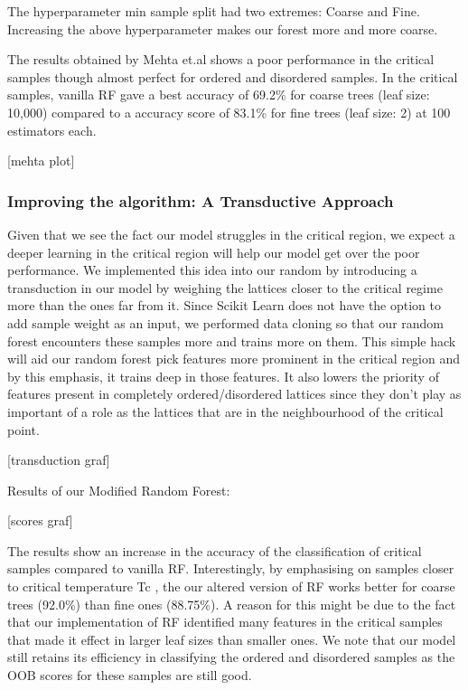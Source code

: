 The hyperparameter min sample split had two extremes: Coarse and Fine. Increasing the above hyperparameter makes our forest more and more coarse.

The results obtained by Mehta et.al\cite{mehta} shows a poor performance in the critical samples though almost perfect for ordered and disordered samples. In the critical samples, vanilla RF gave a best accuracy of 69.2\% for coarse trees (leaf size: 10,000) compared to a accuracy score of 83.1\% for fine trees (leaf size: 2) at 100 estimators each.

[mehta plot]

\subsubsection{Improving the algorithm: A Transductive Approach}
Given that we see the fact our model struggles in the critical region, we expect a deeper learning in the critical region will help our model get over the poor performance. We implemented this idea into our random by introducing a transduction in our model by weighing the lattices closer to the critical regime more than the ones far from it. Since Scikit Learn does not have the option to add sample weight as an input, we performed data cloning so that our random forest encounters these samples more and trains more on them. This simple hack will aid our random forest pick features more prominent in the critical region and by this emphasis, it trains deep in those features. It also lowers the priority of features present in completely ordered/disordered lattices since they don’t play as important of a role as the lattices that are in the neighbourhood of the critical point.

[transduction graf]

Results of our Modified Random Forest:

[scores graf]

The results show an increase in the accuracy of the classification of critical samples compared to vanilla RF. Interestingly, by emphasising on samples closer to critical temperature Tc , the our altered version of RF works better
for coarse trees (92.0\%) than fine ones (88.75\%). A reason for this might be due to the fact that our implementation of RF identified many features in the critical samples that made it effect in larger leaf sizes than smaller ones. We note that our model still retains its efficiency in classifying the ordered and disordered samples as the OOB scores for these samples are still good. 
